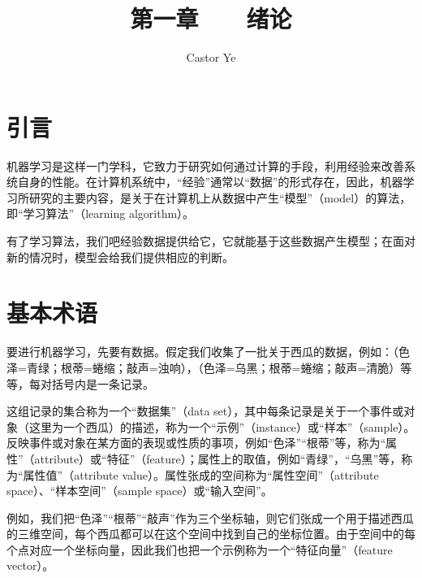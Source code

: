 \documentclass[12pt, a4paper]{article} %
\title{第一章 \ \ \ 绪论} %
\author{Castor Ye} %
\date{} %
\begin{document}
\maketitle %
\newtheorem{definition}{定义}[section]
\newtheorem{theorem}{定理}[section]
\newtheorem{example}{例}[section]
\newtheorem{solution}{题解}
\newtheorem{algorithm}{算法}
\newtheorem{axiom}{公理}
\newtheorem{property}{性质}
\newtheorem{proposition}{命题}
\newtheorem{lemma}{引理}
\newtheorem{corollary}{推论}[section]
\newtheorem{remark}{注解}
\newtheorem{condition}{条件}
\newtheorem{conclusion}{结论}
\newtheorem{assumption}{假设}
\renewcommand{\figurename}{图} %
\renewcommand{\tablename}{表} %
\section{引言}

机器学习是这样一门学科，它致力于研究如何通过计算的手段，利用经验来改善系统自身的性能。在计算机系统中，“经验”通常以“数据”的形式存在，因此，机器学习所研究的主要内容，是关于在计算机上从数据中产生“模型”（model）的算法，即“学习算法”（learning algorithm）。

有了学习算法，我们吧经验数据提供给它，它就能基于这些数据产生模型；在面对新的情况时，模型会给我们提供相应的判断。

\section{基本术语}

要进行机器学习，先要有数据。假定我们收集了一批关于西瓜的数据，例如：（色泽=青绿；根蒂=蜷缩；敲声=浊响），（色泽=乌黑；根蒂=蜷缩；敲声=清脆）等等，每对括号内是一条记录。

这组记录的集合称为一个“数据集”（data set），其中每条记录是关于一个事件或对象（这里为一个西瓜）的描述，称为一个“示例”（instance）或“样本”（sample）。反映事件或对象在某方面的表现或性质的事项，例如“色泽”“根蒂”等，称为“属性”（attribute）或“特征”（feature）；属性上的取值，例如“青绿”，“乌黑”等，称为“属性值”（attribute value）。属性张成的空间称为“属性空间”（attribute space）、“样本空间”（sample space）或“输入空间”。

例如，我们把“色泽”“根蒂”“敲声”作为三个坐标轴，则它们张成一个用于描述西瓜的三维空间，每个西瓜都可以在这个空间中找到自己的坐标位置。由于空间中的每个点对应一个坐标向量，因此我们也把一个示例称为一个“特征向量”（feature vector）。
\end{document}
